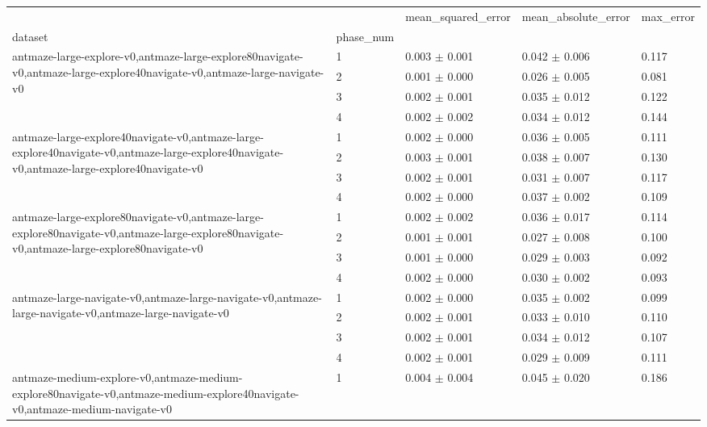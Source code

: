 \begin{tabular}{lllll}
\toprule
 &  & mean_squared_error & mean_absolute_error & max_error \\
dataset & phase_num &  &  &  \\
\midrule
\multirow[t]{4}{*}{antmaze-large-explore-v0,antmaze-large-explore80navigate-v0,antmaze-large-explore40navigate-v0,antmaze-large-navigate-v0} & 1 & 0.003 $\pm$ 0.001 & 0.042 $\pm$ 0.006 & 0.117 \\
 & 2 & 0.001 $\pm$ 0.000 & 0.026 $\pm$ 0.005 & 0.081 \\
 & 3 & 0.002 $\pm$ 0.001 & 0.035 $\pm$ 0.012 & 0.122 \\
 & 4 & 0.002 $\pm$ 0.002 & 0.034 $\pm$ 0.012 & 0.144 \\
\cline{1-5}
\multirow[t]{4}{*}{antmaze-large-explore40navigate-v0,antmaze-large-explore40navigate-v0,antmaze-large-explore40navigate-v0,antmaze-large-explore40navigate-v0} & 1 & 0.002 $\pm$ 0.000 & 0.036 $\pm$ 0.005 & 0.111 \\
 & 2 & 0.003 $\pm$ 0.001 & 0.038 $\pm$ 0.007 & 0.130 \\
 & 3 & 0.002 $\pm$ 0.001 & 0.031 $\pm$ 0.007 & 0.117 \\
 & 4 & 0.002 $\pm$ 0.000 & 0.037 $\pm$ 0.002 & 0.109 \\
\cline{1-5}
\multirow[t]{4}{*}{antmaze-large-explore80navigate-v0,antmaze-large-explore80navigate-v0,antmaze-large-explore80navigate-v0,antmaze-large-explore80navigate-v0} & 1 & 0.002 $\pm$ 0.002 & 0.036 $\pm$ 0.017 & 0.114 \\
 & 2 & 0.001 $\pm$ 0.001 & 0.027 $\pm$ 0.008 & 0.100 \\
 & 3 & 0.001 $\pm$ 0.000 & 0.029 $\pm$ 0.003 & 0.092 \\
 & 4 & 0.002 $\pm$ 0.000 & 0.030 $\pm$ 0.002 & 0.093 \\
\cline{1-5}
\multirow[t]{4}{*}{antmaze-large-navigate-v0,antmaze-large-navigate-v0,antmaze-large-navigate-v0,antmaze-large-navigate-v0} & 1 & 0.002 $\pm$ 0.000 & 0.035 $\pm$ 0.002 & 0.099 \\
 & 2 & 0.002 $\pm$ 0.001 & 0.033 $\pm$ 0.010 & 0.110 \\
 & 3 & 0.002 $\pm$ 0.001 & 0.034 $\pm$ 0.012 & 0.107 \\
 & 4 & 0.002 $\pm$ 0.001 & 0.029 $\pm$ 0.009 & 0.111 \\
\cline{1-5}
\multirow[t]{4}{*}{antmaze-medium-explore-v0,antmaze-medium-explore80navigate-v0,antmaze-medium-explore40navigate-v0,antmaze-medium-navigate-v0} & 1 & 0.004 $\pm$ 0.004 & 0.045 $\pm$ 0.020 & 0.186 \\

\end{tabular}
